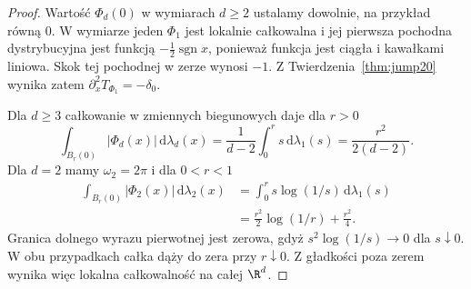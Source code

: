 \begin{proof}
Wartość $\Phi_d(0)$ w wymiarach $d\ge2$ ustalamy
dowolnie, na przykład równą $0$.
W wymiarze jeden $\Phi_1$ jest lokalnie całkowalna
i jej pierwsza pochodna dystrybucyjna jest funkcją
$-\tfrac12\operatorname{sgn}x$, ponieważ funkcja jest ciągła
i kawałkami liniowa. Skok tej pochodnej w zerze wynosi $-1$.
Z Twierdzenia~\ref{thm:jump20} wynika zatem
$\partial_x^2T_{\Phi_1}=-\delta_0$.

Dla $d\ge3$ całkowanie w zmiennych biegunowych daje
dla $r>0$
\[
 \int_{B_r(0)}|\Phi_d(x)|\,\mathrm d\lambda_d(x)
 =\frac1{d-2}\int_0^r s\,\mathrm d\lambda_1(s)
 =\frac{r^2}{2(d-2)}.
\]
Dla $d=2$ mamy $\omega_2=2\pi$ i dla $0<r<1$
\[
 \begin{aligned}
 \int_{B_r(0)}|\Phi_2(x)|\,\mathrm d\lambda_2(x)
 &=\int_0^r s\log(1/s)\,\mathrm d\lambda_1(s)\\
 &=\frac{r^2}{2}\log(1/r)+\frac{r^2}{4}.
 \end{aligned}
\]
Granica dolnego wyrazu pierwotnej jest zerowa,
gdyż $s^2\log(1/s)\to0$ dla $s\downarrow0$.
W obu przypadkach całka dąży do zera przy $r\downarrow0$.
Z gładkości poza zerem wynika więc lokalna
całkowalność na całej $\R^d$.


\end{proof}

